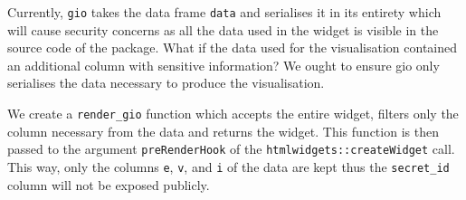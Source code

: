 \documentclass[
]{krantz}
\makeatletter
\newenvironment{Shaded}{\begin{snugshade}}{\end{snugshade}}
\newcommand{\CommentTok}[1]{\textcolor[rgb]{0.37,0.37,0.37}{\textit{#1}}}
\newcommand{\ControlFlowTok}[1]{\textcolor[rgb]{0.27,0.27,0.27}{\textbf{#1}}}
\newcommand{\DataTypeTok}[1]{\textcolor[rgb]{0.27,0.27,0.27}{#1}}
\newcommand{\DecValTok}[1]{\textcolor[rgb]{0.06,0.06,0.06}{#1}}
\newcommand{\KeywordTok}[1]{\textcolor[rgb]{0.27,0.27,0.27}{\textbf{#1}}}
\newcommand{\NormalTok}[1]{#1}
\newcommand{\OperatorTok}[1]{\textcolor[rgb]{0.43,0.43,0.43}{\textbf{#1}}}
\newcommand{\OtherTok}[1]{\textcolor[rgb]{0.37,0.37,0.37}{#1}}
\newcommand{\StringTok}[1]{\textcolor[rgb]{0.5,0.5,0.5}{#1}}
\newenvironment{kframe}{%
\medskip{}
\setlength{\fboxsep}{.8em}
 \def\at@end@of@kframe{}%
 \ifinner\ifhmode%
  \def\at@end@of@kframe{\end{minipage}}%
  \begin{minipage}{\columnwidth}%
 \fi\fi%
 \def\FrameCommand##1{\hskip\@totalleftmargin \hskip-\fboxsep
 \colorbox{shadecolor}{##1}\hskip-\fboxsep
     \hskip-\linewidth \hskip-\@totalleftmargin \hskip\columnwidth}%
 \MakeFramed {\advance\hsize-\width
   \@totalleftmargin\z@ \linewidth\hsize
   \@setminipage}}%
 {\par\unskip\endMakeFramed%
 \at@end@of@kframe}
\renewenvironment{Shaded}{\begin{kframe}}{\end{kframe}}
\makeatother
\begin{document}
Currently, \texttt{gio} takes the data frame \texttt{data} and serialises it in its entirety which will cause security concerns as all the data used in the widget is visible in the source code of the package. What if the data used for the visualisation contained an additional column with sensitive information? We ought to ensure gio only serialises the data necessary to produce the visualisation.

\begin{Shaded}
\end{Shaded}

We create a \texttt{render\_gio} function which accepts the entire widget, filters only the column necessary from the data and returns the widget. This function is then passed to the argument \texttt{preRenderHook} of the \texttt{htmlwidgets::createWidget} call. This way, only the columns \texttt{e}, \texttt{v}, and \texttt{i} of the data are kept thus the \texttt{secret\_id} column will not be exposed publicly.

\begin{Shaded}
\end{Shaded}
\end{document}
